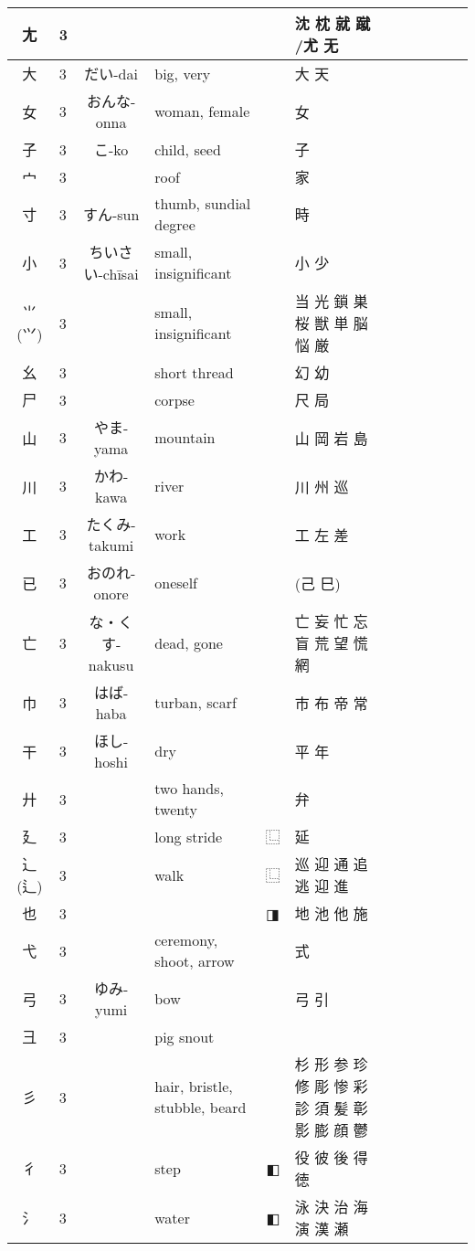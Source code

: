 \documentclass{article}
\begin{document}
{\begin{longtable}{|Cp{1.2cm}|Cp{0.3cm}|Cp{3cm}|Cp{5cm}|Cp{0.5cm}|Cp{5cm}|}
  尢 & 3 &  &  &  & 沈 枕 就 蹴 /尤 无 \\ \hline
  大 & 3 & だい-dai & big, very &  & 大 天 \\ \hline
  女 & 3 & おんな-onna & woman, female &  & 女 \\ \hline
  子 & 3 & こ-ko & child, seed &  & 子 \\ \hline
  宀 & 3 &  & roof &  & 家 \\ \hline
  寸 & 3 & すん-sun & thumb, sundial degree &  & 時 \\ \hline
  小 & 3 & ちいさい-chīsai & small, insignificant &  & 小 少 \\ \hline
  ⺌ (⺍) & 3 &  & small, insignificant &  & 当 光 鎖 巣 桜 獣 単 脳 悩 厳 \\ \hline
  幺 & 3 &  & short thread &  & 幻 幼 \\ \hline
  尸 & 3 &  & corpse &  & 尺 局 \\ \hline
  山 & 3 & やま-yama & mountain &  & 山 岡 岩 島 \\ \hline
  川 & 3 & かわ-kawa & river &  & 川 州 巡 \\ \hline
  工 & 3 & たくみ-takumi & work &  & 工 左 差 \\ \hline
  已 & 3 & おのれ-onore & oneself &  & (己 巳) \\ \hline
  亡 & 3 & な・くす-nakusu & dead, gone &  & 亡 妄 忙 忘 盲 荒 望 慌 網 \\ \hline
  巾 & 3 & はば-haba & turban, scarf &  & 市 布 帝 常 \\ \hline
  干 & 3 & ほし-hoshi & dry &  & 平 年 \\ \hline
  廾 & 3 &  & two hands, twenty &  & 弁 \\ \hline
  廴 & 3 &  & long stride & ⿺ & 延 \\ \hline
  ⻌ (辶) & 3 &  & walk & ⿺ & 巡 迎 通 追 逃 迎 進 \\ \hline
  也 & 3 &  &  & ◨ & 地 池 他 施 \\ \hline
  弋 & 3 &  & ceremony, shoot, arrow &  & 式 \\ \hline
  弓 & 3 & ゆみ-yumi & bow &  & 弓 引 \\ \hline
  彐 & 3 &  & pig snout &  &  \\ \hline
  彡 & 3 &  & hair, bristle, stubble, beard &  & 杉 形 参 珍 修 彫 惨 彩 診 須 髪 彰 影 膨 顔 鬱 \\ \hline
  彳 & 3 &  & step & ◧ & 役 彼 後 得 徳 \\ \hline
  氵 & 3 &  & water & ◧ & 泳 決 治 海 演 漢 瀬 \\ \hline

\end{longtable}}
\end{document}
